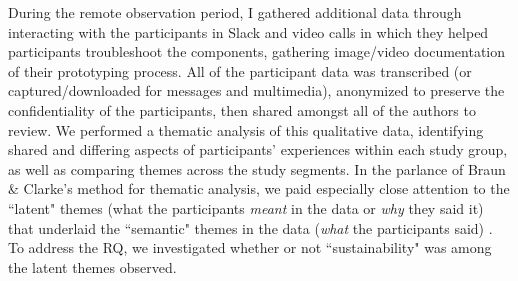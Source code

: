 
During the remote observation period, I gathered additional data through interacting with the participants in Slack and video calls in which they helped participants troubleshoot the components, gathering image/video documentation of their prototyping process.
All of the participant data was transcribed (or captured/downloaded for messages and multimedia), anonymized to preserve the confidentiality of the participants, then shared amongst all of the authors to review. We performed a thematic analysis of this qualitative data, identifying shared and differing aspects of participants' experiences within each study group, as well as comparing themes across the study segments. In the parlance of Braun \& Clarke's method for thematic analysis, we paid especially close attention to the ``latent" themes (what the participants \textit{meant} in the data or \textit{why} they said it) that underlaid the ``semantic" themes in the data (\textit{what} the participants said) \cite{braun_using_2006, maguire_doing_2017}. To address the RQ, we investigated whether or not ``sustainability" was among the latent themes observed.




